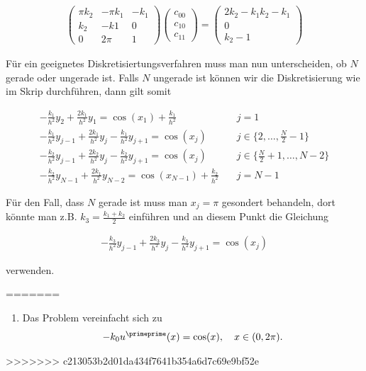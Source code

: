 \begin{solution}
\begin{itemize}
    \begin{align*}
      \left( \begin{array}{ccc}
        \pi k_2 & -\pi k_1 & - k_1 \\
        k_2 & -k1 & 0 \\
        0 & 2\pi & 1
      \end{array}
      \right) \left(
      \begin{array}{c}
        c_{00} \\
        c_{10} \\
        c_{11}
      \end{array}
      \right)
      =
      \left(
      \begin{array}{c}
      2k_2 - k_1 k_2 - k_1 \\
      0 \\
      k_2 - 1
      \end{array}
      \right)
    \end{align*}

    Für ein geeignetes Diskretisiertungsverfahren muss man nun unterscheiden, ob
    $N$ gerade oder ungerade ist. Falls $N$ ungerade ist können wir die Diskretisierung
    wie im Skrip durchführen, dann gilt somit

    \begin{align*}
      -\frac{k_1}{h^2} y_2 + \frac{2k_1}{h^2} y_1
      =
      \cos(x_1) + \frac{k_1}{h^2}
      \quad
      & j = 1 \\
      -\frac{k_1}{h^2} y_{j-1} + \frac{2k_1}{h^2} y_j - \frac{k_1}{h^2}y_{j+1}
      =
      \cos(x_j)
      \quad
      &j \in \{2, \dots, \frac{N}{2}-1\} \\
      -\frac{k_2}{h^2} y_{j-1} + \frac{2k_2}{h^2} y_j - \frac{k_2}{h^2}y_{j+1}
      =
      \cos(x_j)
      \quad
      &j \in \{\frac{N}{2}+1, \dots , N-2\} \\
      -\frac{k_2}{h^2} y_{N-1} + \frac{2k_1}{h^2} y_{N-2}
      =
      \cos(x_{N-1})+ \frac{k_2}{h^2}
      \quad
      & j = N-1
    \end{align*}

    Für den Fall, dass $N$ gerade ist muss man $x_j = \pi$ gesondert behandeln, dort
    könnte man z.B. $k_3 = \frac{k_1 +k_2}{2}$ einführen und an diesem Punkt die Gleichung

    \begin{align*}
    -\frac{k_3}{h^2} y_{j-1} + \frac{2k_3}{h^2} y_j - \frac{k_3}{h^2}y_{j+1}
    =
    \cos(x_j)
    \end{align*}

    verwenden.
  \end{itemize}
=======
  \begin{enumerate}[label = \textbf{\alph*)}]
    \item Das Problem vereinfacht sich zu
    \begin{align*}
      -k_0u^{\primeprime}(x) = \cos(x), \quad x \in (0,2\pi).
    \end{align*}
  \end{enumerate}
>>>>>>> c213053b2d01da434f7641b354a6d7c69e9bf52e
\end{solution}
